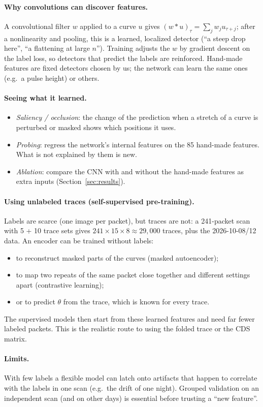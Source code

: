 \documentclass[10pt]{article}
\begin{document}
\begin{advanced}
\paragraph{Why convolutions can discover features.} A convolutional filter $w$ applied to a curve $u$ gives
$(w * u)_\tau = \sum_j w_j u_{\tau+j}$; after a nonlinearity and pooling, this is a learned, localized detector (``a steep drop here'',
``a flattening at large $n$''). Training adjusts the $w$ by gradient descent on the label loss, so detectors that predict the labels are
reinforced. Hand-made features are fixed detectors chosen by us; the network can learn the same ones (e.g.\ a pulse height) or others.

\paragraph{Seeing what it learned.}
\begin{itemize}
\item \emph{Saliency / occlusion}: the change of the prediction when a stretch of a curve is perturbed or masked shows which positions
  it uses.
\item \emph{Probing}: regress the network's internal features on the 85 hand-made features. What is not explained by them is new.
\item \emph{Ablation}: compare the CNN with and without the hand-made features as extra inputs (Section~\ref{sec:results}).
\end{itemize}

\paragraph{Using unlabeled traces (self-supervised pre-training).} Labels are scarce (one image per packet), but traces are not: a 241-packet scan
with 5 + 10 trace sets gives $241 \times 15 \times 8 \approx 29{,}000$ traces, plus the 2026-10-08/12 data. An encoder can be
trained without labels:
\begin{itemize}
\item to reconstruct masked parts of the curves (masked autoencoder);
\item to map two repeats of the same packet close together and different settings apart (contrastive learning);
\item or to predict $\theta$ from the trace, which is known for every trace.
\end{itemize}
The supervised models then start from these learned features and need far fewer labeled packets. This is the realistic route to
using the folded trace or the CDS matrix.

\paragraph{Limits.} With few labels a flexible model can latch onto artifacts that happen to correlate with the labels in one scan
(e.g.\ the drift of one night). Grouped validation on an independent scan (and on other days) is essential before trusting a
``new feature''.
\end{advanced}
\end{document}

